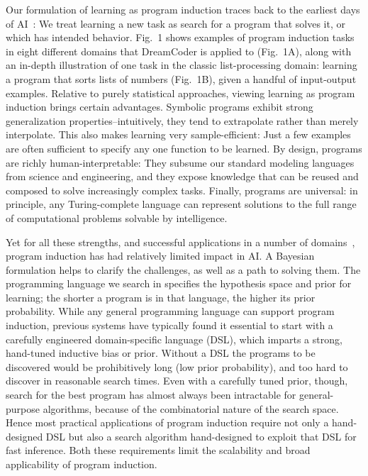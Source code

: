 \documentclass[12pt]{article}
\begin{document}
Our formulation of learning as program induction %
traces back to the earliest days of AI~\cite{solomonoff1964formal}: We treat learning a new task as search for a program that solves it, or which has intended behavior.
Fig.~1 shows examples of program induction tasks in eight different domains that DreamCoder is applied to (Fig.~1A), along with an in-depth illustration of one task in the classic list-processing domain: learning a program that sorts lists of numbers (Fig.~1B), given a handful of input-output examples.
Relative to %
purely statistical approaches, viewing learning as program induction brings certain advantages.
Symbolic programs exhibit strong generalization properties--intuitively, they tend to extrapolate rather than merely interpolate. This also makes learning very sample-efficient: Just a few examples are often sufficient to specify any one function to be learned.  By design, programs are richly human-interpretable: They subsume our standard modeling languages from science and engineering, and they expose knowledge that can be reused and composed to solve increasingly complex tasks.  Finally, programs are universal: in principle, any Turing-complete language %
can represent solutions to the full range of computational problems solvable by intelligence.  

Yet for all these strengths, and successful applications in a number of domains~\cite{liang11dcs, kulkarni2015picture, lake2015human, chater2013programs, gulwani2011automating,lazaro2019beyond,devlin2017neural}, program induction has had relatively limited impact in AI.
A Bayesian formulation helps to clarify the challenges, as well as a path to solving them. The programming language we search in specifies the hypothesis space and prior for learning; the shorter a program is in that language, the higher its prior probability.  While any general programming language can support program induction, previous systems have typically found it essential to start with a carefully engineered domain-specific language (DSL),
which imparts a strong, hand-tuned inductive bias or prior.
Without a DSL the programs to be discovered would be prohibitively long (low prior probability), and too hard to discover in reasonable search times.
Even with a carefully tuned prior, though, search for the best program has almost always been intractable for general-purpose algorithms, because of the combinatorial nature of the search space.
Hence most practical applications of program induction require not only a
hand-designed DSL but also a search algorithm hand-designed to exploit that DSL for fast inference. Both these requirements limit the scalability and broad applicability of program induction.
\end{document}
